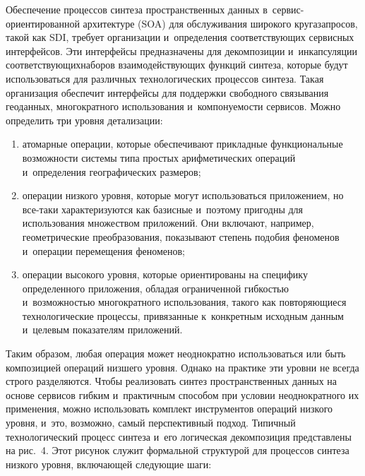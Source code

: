 \begin{multicols}{2}
     Обеспечение процессов синтеза простран\-ст\-венных данных  
в~сервис-ориентированной архитектуре (SOA) для обслуживания 
широкого круга\linebreak запро\-сов, такой как SDI, требует организации и~определения 
соответствующих сервисных интерфейсов. Эти интерфейсы предназначены для 
декомпозиции 
 и~инкапсуляции соответствующих\linebreak наборов взаимодействующих 
функций синтеза, которые будут 
исполь\-зо\-вать\-ся для различных 
технологических процессов синтеза. Такая организация обеспечит интерфейсы 
для поддержки свободного связывания геоданных, многократного 
использования и~компонуемости сервисов. Можно определить три уровня 
детализации:
     \begin{enumerate}[(1)]
\item атомарные операции, которые обеспечивают прикладные 
функциональные возможности системы типа простых арифметических 
операций и~определения географических размеров;
\item операции низкого уровня, которые могут использоваться приложением, 
но все-таки харак\-те\-ризуются как базисные и~поэтому пригодны для 
использования множеством приложений. Они включают, например, 
геометрические преобразования, показывают степень подобия феноменов 
и~операции перемещения феноменов;
\item операции высокого уровня, которые ориентированы на специфику 
определенного приложения, обладая ограниченной гибкостью 
и~возможностью многократного использования, такого как повторяющиеся 
технологические процессы, привязанные к~конкретным исходным данным 
и~целевым показателям приложений.
\end{enumerate}
     
     Таким образом, любая операция может неоднократно использоваться или 
быть композицией операций низшего уровня. Однако на практике эти уровни не 
всегда строго разделяются. Чтобы реализовать синтез пространственных 
данных на основе сервисов гибким и~практичным способом при условии 
неоднократного их применения, можно использовать комплект инструментов 
операций низкого уровня, и~это, возможно, самый перспективный подход. 
Типичный технологический процесс синтеза и~его логическая декомпозиция 
представлены на рис.~4. 
               Этот рисунок служит формальной структурой для процессов синтеза 
низкого уровня, вклю\-ча\-ющей следующие шаги:
\end{multicols}

\begin{figure*} %
 \vspace*{1pt}
 \begin{center}  
  \mbox{%
 \epsfxsize=147.78mm 
 }
\end{center}
\vspace*{-13pt}
\vspace*{-3pt}
\end{figure*}

